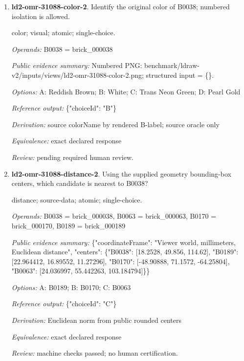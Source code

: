 \begin{enumerate}
\par{\small distance; source-data; atomic; single-choice.\par\textit{Operands:} B0176 = brick\_000176, B0219 = brick\_000219, B0218 = brick\_000218, B0134 = brick\_000134\par\textit{Public evidence summary:} \{"coordinateFrame": "Viewer world, millimeters, Euclidean distance", "centers": \{"B0176": [-33.556, 26.7832, -46.9752], "B0134": [-22.2252, 26.8516, -9.6216], "B0218": [55.2016, 12, -67.3224], "B0219": [60.4518, 12, -67.413]\}\}\par\textit{Options:} A: B0134; B: B0219; C: B0218\par\textit{Reference output:} \{"choiceId": "A"\}\par\textit{Derivation:} Euclidean norm from public rounded centers\par\textit{Equivalence:} exact declared response\par\textit{Review:} machine checks passed; no human certification.}
\item \textbf{ld2-omr-31088-color-2}. Identify the original color of B0038; numbered isolation is allowed.
\par{\small color; visual; atomic; single-choice.\par\textit{Operands:} B0038 = brick\_000038\par\textit{Public evidence summary:} Numbered PNG: benchmark/ldraw-v2/inputs/views/ld2-omr-31088-color-2.png; structured input = \{\}.\par\textit{Options:} A: Reddish Brown; B: White; C: Trans Neon Green; D: Pearl Gold\par\textit{Reference output:} \{"choiceId": "B"\}\par\textit{Derivation:} source colorName by rendered B-label; source oracle only\par\textit{Equivalence:} exact declared response\par\textit{Review:} pending required human review.}
\item \textbf{ld2-omr-31088-distance-2}. Using the supplied geometry bounding-box centers, which candidate is nearest to B0038?
\par{\small distance; source-data; atomic; single-choice.\par\textit{Operands:} B0038 = brick\_000038, B0063 = brick\_000063, B0170 = brick\_000170, B0189 = brick\_000189\par\textit{Public evidence summary:} \{"coordinateFrame": "Viewer world, millimeters, Euclidean distance", "centers": \{"B0038": [18.2528, 49.856, 114.62], "B0189": [22.964412, 16.89552, 11.27296], "B0170": [-48.90888, 71.1572, -64.25804], "B0063": [24.036997, 55.442263, 103.184794]\}\}\par\textit{Options:} A: B0189; B: B0170; C: B0063\par\textit{Reference output:} \{"choiceId": "C"\}\par\textit{Derivation:} Euclidean norm from public rounded centers\par\textit{Equivalence:} exact declared response\par\textit{Review:} machine checks passed; no human certification.}

\end{enumerate}

